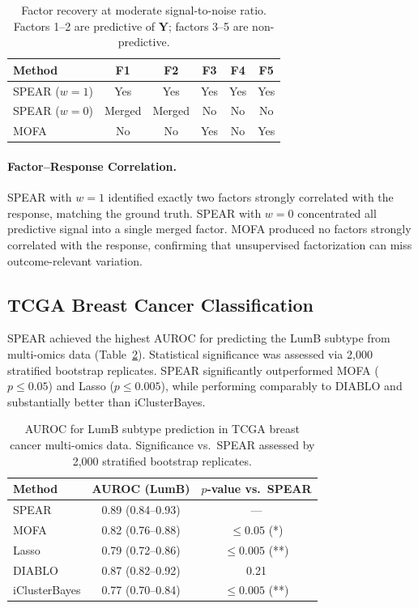\documentclass[11pt]{article}
\begin{document}
\begin{table}[htbp]
\centering
\caption{Factor recovery at moderate signal-to-noise ratio. Factors 1--2 are predictive of $\mathbf{Y}$; factors 3--5 are non-predictive.}
\label{tab:factor_recovery}
\begin{tabular}{lccccc}
\toprule
\textbf{Method} & \textbf{F1} & \textbf{F2} & \textbf{F3} & \textbf{F4} & \textbf{F5} \\
\midrule
SPEAR ($w=1$) & Yes & Yes & Yes & Yes & Yes \\
SPEAR ($w=0$) & Merged & Merged & No & No & No \\
MOFA & No & No & Yes & No & Yes \\
\bottomrule
\end{tabular}
\end{table}

\paragraph{Factor--Response Correlation.} SPEAR with $w=1$ identified exactly two factors strongly correlated with the response, matching the ground truth. SPEAR with $w=0$ concentrated all predictive signal into a single merged factor. MOFA produced no factors strongly correlated with the response, confirming that unsupervised factorization can miss outcome-relevant variation.

\subsection{TCGA Breast Cancer Classification}

SPEAR achieved the highest AUROC for predicting the LumB subtype from multi-omics data (Table~\ref{tab:tcga_auroc}). Statistical significance was assessed via 2,000 stratified bootstrap replicates. SPEAR significantly outperformed MOFA ($p \leq 0.05$) and Lasso ($p \leq 0.005$), while performing comparably to DIABLO and substantially better than iClusterBayes.

\begin{table}[htbp]
\centering
\caption{AUROC for LumB subtype prediction in TCGA breast cancer multi-omics data. Significance vs.\ SPEAR assessed by 2,000 stratified bootstrap replicates.}
\label{tab:tcga_auroc}
\begin{tabular}{lcc}
\toprule
\textbf{Method} & \textbf{AUROC (LumB)} & \textbf{$p$-value vs.\ SPEAR} \\
\midrule
SPEAR & 0.89 (0.84--0.93) & --- \\
MOFA & 0.82 (0.76--0.88) & $\leq 0.05$ (*) \\
Lasso & 0.79 (0.72--0.86) & $\leq 0.005$ (**) \\
DIABLO & 0.87 (0.82--0.92) & 0.21 \\
iClusterBayes & 0.77 (0.70--0.84) & $\leq 0.005$ (**) \\
\bottomrule
\end{tabular}
\end{table}
\end{document}
